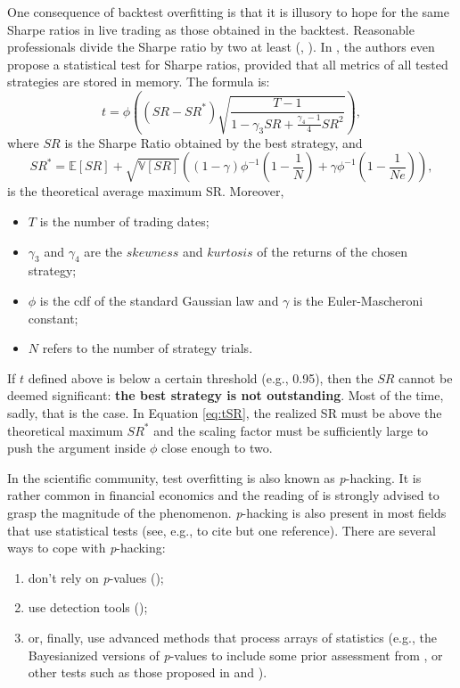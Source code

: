 \documentclass[]{krantz}
\providecommand{\tightlist}{%
  \setlength{\itemsep}{0pt}\setlength{\parskip}{0pt}}
\theoremstyle{definition}
\theoremstyle{definition}
\theoremstyle{definition}
\theoremstyle{remark}
\begin{document}
One consequence of backtest overfitting is that it is illusory to hope
for the same Sharpe ratios in live trading as those obtained in the
backtest. Reasonable professionals divide the Sharpe ratio by two at
least (\citet{harvey2015backtesting}, \citet{suhonen2017quantifying}).
In \citet{bailey2014deflated}, the authors even propose a statistical
test for Sharpe ratios, provided that all metrics of all tested
strategies are stored in memory. The formula is: \begin{equation}
\label{eq:tSR}
t = \phi\left((SR-SR^*)\sqrt{\frac{T-1}{1-\gamma_3SR+\frac{\gamma_4-1}{4}SR^2}} \right),
\end{equation} where \(SR\) is the Sharpe Ratio obtained by the best
strategy, and
\[SR^*=\mathbb{E}[SR]+\sqrt{\mathbb{V}[SR]}\left((1-\gamma)\phi^{-1}\left(1-\frac{1}{N}\right)+\gamma \phi^{-1}\left(1-\frac{1}{Ne}\right)  \right),\]
is the theoretical average maximum SR. Moreover,

\begin{itemize}
\item $T$ is the number of trading dates;
\item $\gamma_3$ and $\gamma_4$ are the $skewness$ and $kurtosis$ of the returns of the chosen strategy;
\item $\phi$ is the cdf of the standard Gaussian law and $\gamma$ is the Euler-Mascheroni constant; 
\item $N$ refers to the number of strategy trials. 
\end{itemize}

If \(t\) defined above is below a certain threshold (e.g., 0.95), then
the \(SR\) cannot be deemed significant:
\textbf{the best strategy is not outstanding}. Most of the time, sadly,
that is the case. In Equation \eqref{eq:tSR}, the realized SR must be
above the theoretical maximum \(SR^*\) and the scaling factor must be
sufficiently large to push the argument inside \(\phi\) close enough to
two.

In the scientific community, test overfitting is also known as
\emph{p}-hacking. It is rather common in financial economics and the
reading of \citet{harvey2017presidential} is strongly advised to grasp
the magnitude of the phenomenon. \emph{p}-hacking is also present in
most fields that use statistical tests (see, e.g.,
\citet{head2015extent} to cite but one reference). There are several
ways to cope with \emph{p}-hacking:

\begin{enumerate}
\def\labelenumi{\arabic{enumi}.}
\tightlist
\item
  don't rely on \emph{p}-values (\citet{amrhein2019scientists});\\
\item
  use detection tools (\citet{elliott2019detecting});\\
\item
  or, finally, use advanced methods that process arrays of statistics
  (e.g., the Bayesianized versions of \emph{p}-values to include some
  prior assessment from \citet{harvey2017presidential}, or other tests
  such as those proposed in \citet{romano2005stepwise} and
  \citet{simonsohn2014p}).
\end{enumerate}
\end{document}
